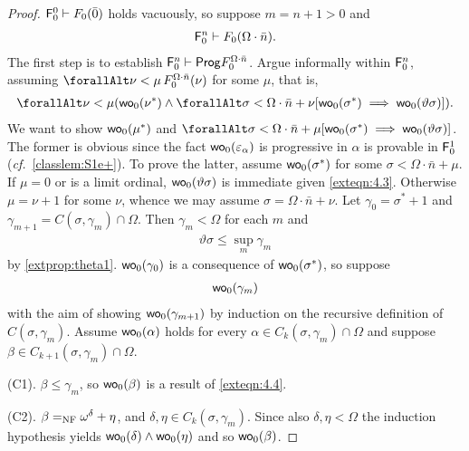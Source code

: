 \documentclass[UKenglish,cleveref,DIV=12]{scrartcl}
\let\forall\forallAlt
\theoremstyle{definition}
\theoremstyle{definition}
\begin{document}
\begin{proof}
$\mathsf{F}_0^0\vdash F_0(\bar0)$ holds vacuously, so suppose $m=n+1>0$ and
\begin{align}\label{exteqn:4.1}
\mathsf{F}_0^n\vdash F_0(\Omega\cdot\bar n).
\end{align}
The first step is to establish
  $\mathsf{F}_0^n\vdash\mathsf{Prog} F^{\Omega\cdot\bar n}_0$.
Argue informally within $\mathsf{F}_0^n$, assuming $\forall\nu<\mu\, F_0^{\Omega\cdot\bar n}(\nu)$ for some $\mu$, that is,
\begin{gather}\label{exteqn:4.3}
  \forall\nu<\mu(\wo_0(\nu^*)\land\forall\sigma<\Omega\cdot\bar n+\nu[\wo_0(\sigma^*)\implies\wo_0(\vartheta\sigma)]).
\end{gather}
We want to show $\mathsf{wo}_0(\mu^*)$ and $\forall\sigma<\Omega\cdot\bar n+\mu[\wo_0(\sigma^*)\implies\wo_0(\vartheta\sigma)]$. The former is obvious since the fact $\mathsf{wo}_0(\varepsilon_\alpha)$ is progressive in $\alpha$ is provable in $\mathsf{F}_0^1$ ({\em cf.}~\cref{classlem:S1e+}). To prove the latter, assume $\mathsf{wo}_0(\sigma^*)$ for some $\sigma<\Omega\cdot\bar n+\mu$. If $\mu=0$ or is
a limit ordinal, $\mathsf{wo}_0(\vartheta\sigma)$ is immediate given \cref{exteqn:4.3}. Otherwise $\mu=\nu+1$
for some $\nu$, whence we may assume $\sigma=\Omega\cdot\bar n+\nu$. Let
$\gamma_0=\sigma^*+1$ and $\gamma_{m+1}=C(\sigma,\gamma_m)\cap\Omega$. Then
$\gamma_m<\Omega$ for each $m$ and
\begin{align*}
  \vartheta \sigma\le\sup_{m}\gamma_m
\end{align*}
by \cref{extprop:theta1}. $\mathsf{wo}_0(\gamma_0)$ is a consequence of
$\mathsf{wo}_0(\sigma^*)$, so suppose
\begin{align}\label{exteqn:4.4}
 \mathsf{wo}_0(\gamma_m)
\end{align}
with the aim of showing $\mathsf{wo}_0(\gamma_{m+1})$ by induction on the recursive
definition of $C(\sigma,\gamma_m)$. Assume $\mathsf{wo}_0(\alpha)$ holds for every
$\alpha\in C_{k}(\sigma,\gamma_m)\cap\Omega$ and suppose $\beta\in
C_{k+1}(\sigma,\gamma_m)\cap\Omega$.

(C1). $\beta\le\gamma_m$, so $\mathsf{wo}_0(\beta)$ is a result of \cref{exteqn:4.4}.

(C2). $\beta=_{\mathrm{NF}}\omega^\delta+\eta$, and $\delta,\eta\in C_k(\sigma,\gamma_m)$.
Since also $\delta,\eta<\Omega$ the induction hypothesis yields
$\mathsf{wo}_0(\delta)\land\mathsf{wo}_0(\eta)$ and so $\mathsf{wo}_0(\beta)$.


\end{proof}
\end{document}
